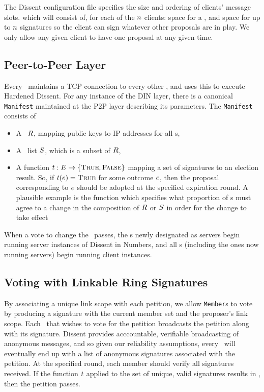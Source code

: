 The Dissent configuration file specifies the size and ordering of clients'
message slots. which will
consist of, for each of the $n$ clients: space for a \StructBallot, and space
for up to $n$ signatures so the client can sign whatever other proposals are in
play.  We only allow any given client to have one proposal at any given time.

\subsection{Peer-to-Peer Layer}
Every \KwMember~maintains a TCP connection to every other \KwMember,
and uses this to execute Hardened Dissent.
For any instance of the DIN layer, there is a canonical \texttt{Manifest}
maintained at the P2P layer describing its parameters. The \texttt{Manifest}
consists of
\begin{itemize}
  \item A \KwRoster~$R$, mapping public keys to IP addresses for all
    \KwClient s,
  \item A \KwServer~list $S$, which is a subset of $R$,
  \item A function $t : E \to \{\textsc{True}, \textsc{False}\}$
    mapping a set of signatures to an election result. So, if
    $t(e) = \textsc{True}$ for some outcome $e$,
    then the proposal corresponding to $e$ should be adopted at the
    specified expiration round. A plausible example is the function which
    specifies what proportion of \KwMember s must agree to a change in the
    composition of $R$ or $S$ in order for the change to take
    effect
\end{itemize}

When a vote to change the \KwManifest~passes, the \KwMember s newly
designated as servers begin running server instances of Dissent in Numbers, and
all \KwMember s (including the ones now running servers) begin running
client instances.

\subsection{Voting with Linkable Ring Signatures}
By associating a unique link scope with each petition, we allow \texttt{Member}s
to vote by producing a signature with the current member set and the proposer's
link scope. Each \KwMember~that wishes to vote for the petition broadcasts
the petition along with its signature. Dissent provides acccountable, verifiable
broadcasting of anonymous messages, and so given our reliability assumptions,
every \KwMember~will eventually end up with a list of anonymous signatures
associated with the petition. At the specified round, each member should verify
all signatures received. If the function $t$ applied to the set of unique, valid
signatures results in \AtomTrue, then the petition passes.

